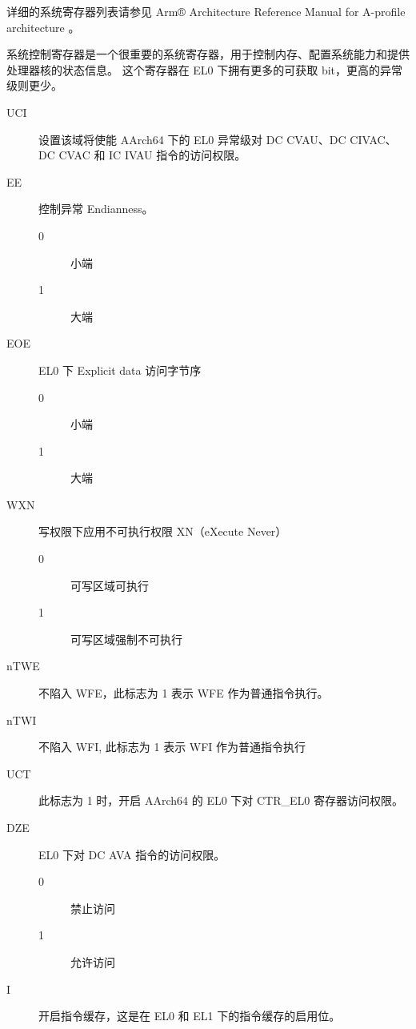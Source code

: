详细的系统寄存器列表请参见 Arm® Architecture Reference Manual for A-profile architecture \cite{armrefman}。

系统控制寄存器是一个很重要的系统寄存器，用于控制内存、配置系统能力和提供处理器核的状态信息。
这个寄存器在 EL0 下拥有更多的可获取 bit，更高的异常级则更少。


\begin{description}
  \item[UCI] 设置该域将使能 AArch64 下的 EL0 异常级对 DC CVAU、DC CIVAC、DC CVAC 和 IC IVAU 指令的访问权限。
  \item[EE] 控制异常 Endianness。
    \begin{description}
      \item[0] 小端 
      \item[1] 大端
    \end{description}
  \item[EOE] EL0 下 Explicit data 访问字节序
    \begin{description}
      \item[0] 小端 
      \item[1] 大端
    \end{description}
  \item[WXN] 写权限下应用不可执行权限 XN（eXecute Never）
    \begin{description}
      \item[0] 可写区域可执行
      \item[1] 可写区域强制不可执行
    \end{description}
  \item[nTWE] 不陷入 WFE，此标志为 1 表示 WFE 作为普通指令执行。
  \item[nTWI] 不陷入 WFI, 此标志为 1 表示 WFI 作为普通指令执行
  \item[UCT] 此标志为 1 时，开启 AArch64 的 EL0 下对 CTR\_EL0 寄存器访问权限。
  \item[DZE] EL0 下对 DC AVA 指令的访问权限。
    \begin{description}
      \item[0] 禁止访问
      \item[1] 允许访问
    \end{description}
  \item[I] 开启指令缓存，这是在 EL0 和 EL1 下的指令缓存的启用位。

\end{description}
